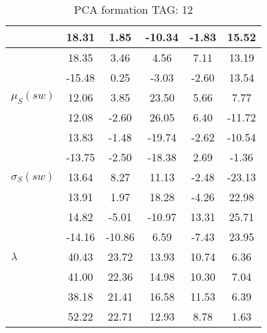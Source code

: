 \begin{table}[h!]
\begin{center}
\begin{tabular}{| l | c | c | c | c | c |}
 & 18.31  & 1.85  & -10.34  & -1.83  & 15.52 \\\hline
 & 18.35  & 3.46  & 4.56  & 7.11  & 13.19 \\\hline
 & -15.48  & 0.25  & -3.03  & -2.60  & 13.54 \\\hline
$\mu_S(sw)$ & 12.06  & 3.85  & 23.50  & 5.66  & 7.77 \\\hline
 & 12.08  & -2.60  & 26.05  & 6.40  & -11.72 \\\hline
 & 13.83  & -1.48  & -19.74  & -2.62  & -10.54 \\\hline
 & -13.75  & -2.50  & -18.38  & 2.69  & -1.36 \\\hline
$\sigma_S(sw)$ & 13.64  & 8.27  & 11.13  & -2.48  & -23.13 \\\hline
 & 13.91  & 1.97  & 18.28  & -4.26  & 22.98 \\\hline
 & 14.82  & -5.01  & -10.97  & 13.31  & 25.71 \\\hline
 & -14.16  & -10.86  & 6.59  & -7.43  & 23.95 \\\hline
$\lambda$ & 40.43  & 23.72  & 13.93  & 10.74  & 6.36 \\\hline
 & 41.00  & 22.36  & 14.98  & 10.30  & 7.04 \\\hline
 & 38.18  & 21.41  & 16.58  & 11.53  & 6.39 \\\hline
 & 52.22  & 22.71  & 12.93  & 8.78  & 1.63 \\\hline
\end{tabular}
\caption{PCA formation TAG: 12}
\end{center}
\end{table}